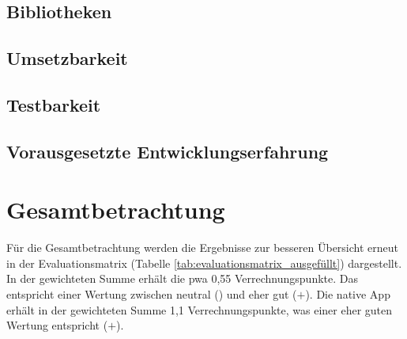 \subsection{Bibliotheken} \label{sec:6-bibliotheken}


\subsection{Umsetzbarkeit} \label{sec:6-umsetzung}


\subsection{Testbarkeit} \label{sec:6-testbarkeit}


\subsection{Vorausgesetzte Entwicklungserfahrung} \label{sec:6-vorausgesetzte-entwicklungserfahrung}


%

\section{Gesamtbetrachtung}
Für die Gesamtbetrachtung werden die Ergebnisse zur besseren Übersicht erneut in der Evaluationsmatrix (Tabelle \ref{tab:evaluationsmatrix_ausgefüllt}) dargestellt. In der gewichteten Summe erhält die \ac{pwa} 0,55 Verrechnungspunkte. Das entspricht einer Wertung zwischen neutral (\Circle) und eher gut ($+$). Die native App erhält in der gewichteten Summe 1,1 Verrechnungspunkte, was einer eher guten Wertung entspricht ($+$).

